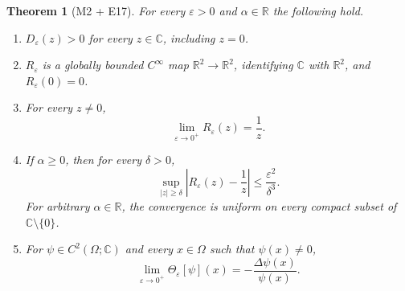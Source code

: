 \documentclass[11pt]{article}
\newtheorem{theorem}{Theorem}
\newcommand{\C}{\mathbb{C}}
\newcommand{\R}{\mathbb{R}}
\newcommand{\eps}{\varepsilon}
\newcommand{\Reps}{R_{\eps}}
\newcommand{\Deps}{D_{\eps}}
\newcommand{\Thetaeps}{\Theta_{\eps}}
\begin{document}
\begin{theorem}[M2 + E17]\label{thm:main}
For every $\eps>0$ and $\alpha\in\R$ the following hold.
\begin{enumerate}
\item $\Deps(z)>0$ for every $z\in\C$, including $z=0$.
\item $\Reps$ is a globally bounded $C^\infty$ map $\R^2\to\R^2$,
identifying $\C$ with $\R^2$, and $\Reps(0)=0$.
\item For every $z\ne0$,
\begin{equation}\label{eq:limit}
\lim_{\eps\to0^+}\Reps(z)=\frac{1}{z}.
\end{equation}
\item If $\alpha\ge0$, then for every $\delta>0$,
\begin{equation}\label{eq:uniform}
\sup_{|z|\ge\delta}
\left|\Reps(z)-\frac1z\right|
\le\frac{\eps^2}{\delta^3}.
\end{equation}
For arbitrary $\alpha\in\R$, the convergence is uniform on every
compact subset of $\C\setminus\{0\}$.
\item For $\psi\in C^2(\Omega;\C)$ and every $x\in\Omega$ such that
$\psi(x)\ne0$,
\begin{equation}\label{eq:curvaturelimit}
\lim_{\eps\to0^+}\Thetaeps[\psi](x)
=-\frac{\Delta\psi(x)}{\psi(x)}.
\end{equation}
\end{enumerate}
\end{theorem}
\end{document}
